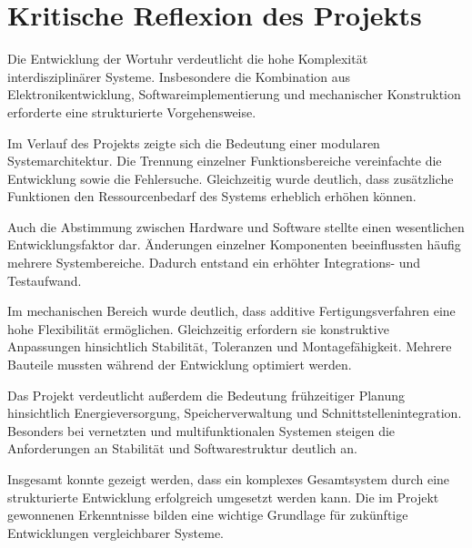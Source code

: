 \section{Kritische Reflexion des Projekts} 
Die Entwicklung der Wortuhr verdeutlicht die hohe Komplexität interdisziplinärer Systeme. 
Insbesondere die Kombination aus Elektronikentwicklung, Softwareimplementierung und mechanischer Konstruktion erforderte eine strukturierte Vorgehensweise.

Im Verlauf des Projekts zeigte sich die Bedeutung einer modularen Systemarchitektur. 
Die Trennung einzelner Funktionsbereiche vereinfachte die Entwicklung sowie die Fehlersuche. 
Gleichzeitig wurde deutlich, dass zusätzliche Funktionen den Ressourcenbedarf des Systems erheblich erhöhen können.

Auch die Abstimmung zwischen Hardware und Software stellte einen wesentlichen Entwicklungsfaktor dar. 
Änderungen einzelner Komponenten beeinflussten häufig mehrere Systembereiche. 
Dadurch entstand ein erhöhter Integrations- und Testaufwand.

Im mechanischen Bereich wurde deutlich, dass additive Fertigungsverfahren eine hohe Flexibilität ermöglichen. 
Gleichzeitig erfordern sie konstruktive Anpassungen hinsichtlich Stabilität, Toleranzen und Montagefähigkeit. 
Mehrere Bauteile mussten während der Entwicklung optimiert werden.

Das Projekt verdeutlicht außerdem die Bedeutung frühzeitiger Planung hinsichtlich Energieversorgung, Speicherverwaltung und Schnittstellenintegration. 
Besonders bei vernetzten und multifunktionalen Systemen steigen die Anforderungen an Stabilität und Softwarestruktur deutlich an.

Insgesamt konnte gezeigt werden, dass ein komplexes Gesamtsystem durch eine strukturierte Entwicklung erfolgreich umgesetzt werden kann. 
Die im Projekt gewonnenen Erkenntnisse bilden eine wichtige Grundlage für zukünftige Entwicklungen vergleichbarer Systeme.